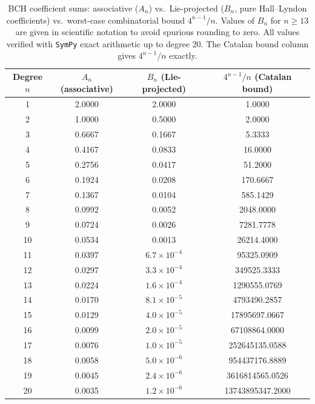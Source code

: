 \documentclass[10pt]{amsart}
\theoremstyle{definition}
\theoremstyle{remark}
\numberwithin{equation}{section}
\begin{document}
\begin{table}[hbpt]
\centering
\caption{BCH coefficient sums: associative ($A_n$) vs.\ Lie-projected ($B_n$, pure
Hall--Lyndon coefficients) vs.\ worst-case combinatorial bound $4^{n-1}/n$.
Values of $B_n$ for $n \ge 13$ are given in scientific notation to avoid spurious
rounding to zero.  All values verified with \texttt{SymPy} exact arithmetic up to
degree 20.  The Catalan bound column gives $4^{n-1}/n$ exactly.}
\label{tab:bchcoeff}
\begin{tabular}{cccc}
\toprule
Degree $n$ & $A_n$ (associative) & $B_n$ (Lie-projected) & $4^{n-1}/n$ (Catalan bound)\\
\midrule
1  & 2.0000 & 2.0000              & 1.0000\\
2  & 1.0000 & 0.5000              & 2.0000\\
3  & 0.6667 & 0.1667              & 5.3333\\
4  & 0.4167 & 0.0833              & 16.0000\\
5  & 0.2756 & 0.0417              & 51.2000\\
6  & 0.1924 & 0.0208              & 170.6667\\
7  & 0.1367 & 0.0104              & 585.1429\\
8  & 0.0992 & 0.0052              & 2048.0000\\
9  & 0.0724 & 0.0026              & 7281.7778\\
10 & 0.0534 & 0.0013              & 26214.4000\\
11 & 0.0397 & $6.7 \times 10^{-4}$& 95325.0909\\
12 & 0.0297 & $3.3 \times 10^{-4}$& 349525.3333\\
13 & 0.0224 & $1.6 \times 10^{-4}$& 1290555.0769\\
14 & 0.0170 & $8.1 \times 10^{-5}$& 4793490.2857\\
15 & 0.0129 & $4.0 \times 10^{-5}$& 17895697.0667\\
16 & 0.0099 & $2.0 \times 10^{-5}$& 67108864.0000\\
17 & 0.0076 & $1.0 \times 10^{-5}$& 252645135.0588\\
18 & 0.0058 & $5.0 \times 10^{-6}$& 954437176.8889\\
19 & 0.0045 & $2.4 \times 10^{-6}$& 3616814565.0526\\
20 & 0.0035 & $1.2 \times 10^{-6}$& 13743895347.2000\\
\bottomrule
\end{tabular}
\end{table}
\end{document}
